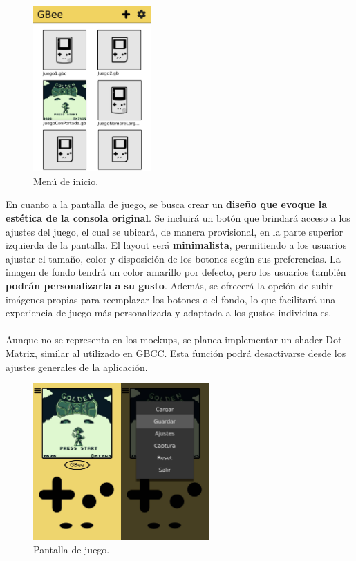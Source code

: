 \begin{figure}[h]
    \centering
    \includegraphics[width=0.4\textwidth]{include/images/mockup_menu.jpg}
    \caption{Menú de inicio.}
    \label{figure:mockupmenu}
\end{figure}

En cuanto a la pantalla de juego, se busca crear un \textbf{diseño que evoque la estética de la consola original}. Se incluirá un botón que brindará acceso a los ajustes del juego, el cual se ubicará, de manera provisional, en la parte superior izquierda de la pantalla. El layout será \textbf{minimalista}, permitiendo a los usuarios ajustar el tamaño, color y disposición de los botones según sus preferencias. La imagen de fondo tendrá un color amarillo por defecto, pero los usuarios también \textbf{podrán personalizarla a su gusto}. Además, se ofrecerá la opción de subir imágenes propias para reemplazar los botones o el fondo, lo que facilitará una experiencia de juego más personalizada y adaptada a los gustos individuales.
\\\\
Aunque no se representa en los mockups, se planea implementar un shader Dot-Matrix, similar al utilizado en GBCC. Esta función podrá desactivarse desde los ajustes generales de la aplicación.

\begin{figure}[h]
    \centering
    \includegraphics[width=0.6\textwidth]{include/images/mockgame.jpg}
    \caption{Pantalla de juego.}
    \label{figure:mockupgame}
\end{figure}

\cleardoublepage